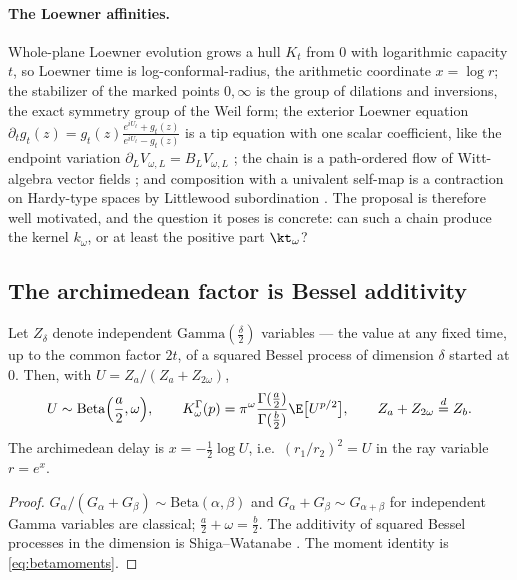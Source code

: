 \paragraph{The Loewner affinities.} Whole-plane Loewner evolution grows a hull
$K_t$ from $0$ with logarithmic capacity $t$, so Loewner time is
log-conformal-radius, the arithmetic coordinate $x=\log r$; the stabilizer of
the marked points $0,\infty$ is the group of dilations and inversions, the
exact symmetry group of the Weil form; the exterior Loewner equation
$\partial_tg_t(z)=g_t(z)\frac{e^{iU_t}+g_t(z)}{e^{iU_t}-g_t(z)}$ is a tip
equation with one scalar coefficient, like the endpoint variation
$\partial_LV_{\omega,L}=B_LV_{\omega,L}$ \cite[Proposition~9.1]{WilsonLines};
the chain is a path-ordered flow of Witt-algebra vector fields
\cite{BauerBernard,Lawler}; and composition with a univalent self-map is a contraction
on Hardy-type spaces by Littlewood subordination \cite{Shapiro}. The proposal
is therefore well motivated, and the question it poses is concrete: can such a
chain produce the kernel $k_\omega$, or at least the positive part $\kt_\omega$?

\subsection{The archimedean factor is Bessel additivity}

\begin{proposition}\label{prop:bessel}
Let $Z_\delta$ denote independent $\mathrm{Gamma}(\frac\delta2)$ variables ---
the value at any fixed time, up to the common factor $2t$, of a squared Bessel
process of dimension $\delta$ started at $0$. Then, with $U=Z_a/(Z_a+Z_{2\omega})$,
\begin{equation}\label{eq:bessel}
 U\sim\mathrm{Beta}\Big(\frac a2,\omega\Big),\qquad
 K^\Gamma_\omega(p)=\pi^\omega\frac{\Gamma(\frac a2)}{\Gamma(\frac b2)}\E\big[U^{p/2}\big],
 \qquad Z_a+Z_{2\omega}\stackrel d=Z_b .
\end{equation}
The archimedean delay is $x=-\frac12\log U$, i.e.\ $(r_1/r_2)^2=U$ in the ray
variable $r=e^x$.
\end{proposition}
\begin{proof}
$G_\alpha/(G_\alpha+G_\beta)\sim\mathrm{Beta}(\alpha,\beta)$ and
$G_\alpha+G_\beta\sim G_{\alpha+\beta}$ for independent Gamma variables are
classical; $\frac a2+\omega=\frac b2$. The additivity of squared Bessel
processes in the dimension is Shiga--Watanabe \cite{ShigaWatanabe,RevuzYor}.
The moment identity is \eqref{eq:betamoments}.
\end{proof}

